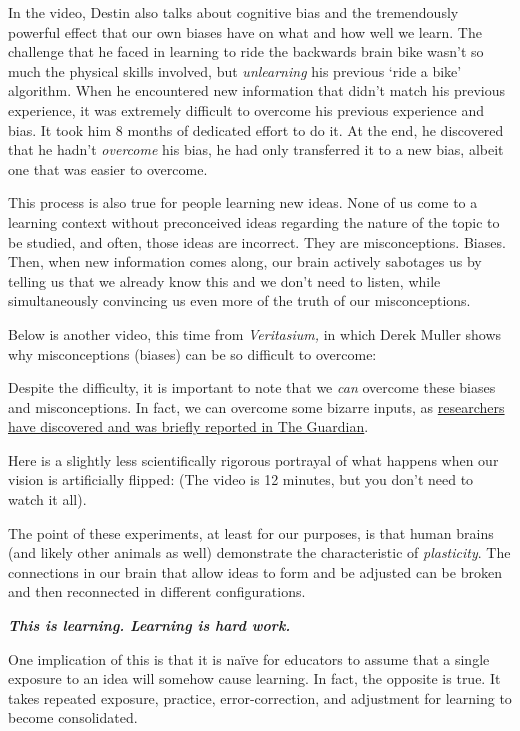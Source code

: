 \documentclass[
]{book}
\begin{document}
In the video, Destin also talks about cognitive bias and the tremendously powerful effect that our own biases have on what and how well we learn. The challenge that he faced in learning to ride the backwards brain bike wasn't so much the physical skills involved, but \emph{unlearning} his previous `ride a bike' algorithm. When he encountered new information that didn't match his previous experience, it was extremely difficult to overcome his previous experience and bias. It took him 8 months of dedicated effort to do it. At the end, he discovered that he hadn't \emph{overcome} his bias, he had only transferred it to a new bias, albeit one that was easier to overcome.

This process is also true for people learning new ideas. None of us come to a learning context without preconceived ideas regarding the nature of the topic to be studied, and often, those ideas are incorrect. They are misconceptions. Biases. Then, when new information comes along, our brain actively sabotages us by telling us that we already know this and we don't need to listen, while simultaneously convincing us even more of the truth of our misconceptions.

Below is another video, this time from \emph{Veritasium,} in which Derek Muller shows why misconceptions (biases) can be so difficult to overcome:

Despite the difficulty, it is important to note that we \emph{can} overcome these biases and misconceptions. In fact, we can overcome some bizarre inputs, as \href{https://www.theguardian.com/education/2012/nov/12/improbable-research-seeing-upside-down}{researchers have discovered and was briefly reported in The Guardian}.

Here is a slightly less scientifically rigorous portrayal of what happens when our vision is artificially flipped: (The video is 12 minutes, but you don't need to watch it all).

The point of these experiments, at least for our purposes, is that human brains (and likely other animals as well) demonstrate the characteristic of \emph{plasticity}. The connections in our brain that allow ideas to form and be adjusted can be broken and then reconnected in different configurations.

\textbf{\emph{This is learning. Learning is hard work.}}

One implication of this is that it is naïve for educators to assume that a single exposure to an idea will somehow cause learning. In fact, the opposite is true. It takes repeated exposure, practice, error-correction, and adjustment for learning to become consolidated.
\end{document}
